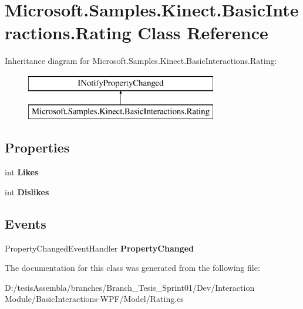 \hypertarget{class_microsoft_1_1_samples_1_1_kinect_1_1_basic_interactions_1_1_rating}{\section{Microsoft.\-Samples.\-Kinect.\-Basic\-Interactions.\-Rating Class Reference}
\label{class_microsoft_1_1_samples_1_1_kinect_1_1_basic_interactions_1_1_rating}
}
Inheritance diagram for Microsoft.\-Samples.\-Kinect.\-Basic\-Interactions.\-Rating\-:\begin{figure}[H]
\begin{center}
\leavevmode
\includegraphics[height=2.000000cm]{class_microsoft_1_1_samples_1_1_kinect_1_1_basic_interactions_1_1_rating}
\end{center}
\end{figure}
\subsection*{Properties}
\begin{DoxyCompactItemize}
\item 
\hypertarget{class_microsoft_1_1_samples_1_1_kinect_1_1_basic_interactions_1_1_rating_a912f80993885daf0d02cd237e120396e}{int {\bfseries Likes}}\label{class_microsoft_1_1_samples_1_1_kinect_1_1_basic_interactions_1_1_rating_a912f80993885daf0d02cd237e120396e}

\item 
\hypertarget{class_microsoft_1_1_samples_1_1_kinect_1_1_basic_interactions_1_1_rating_acacccf3c863254b6037c9752618b7968}{int {\bfseries Dislikes}}\label{class_microsoft_1_1_samples_1_1_kinect_1_1_basic_interactions_1_1_rating_acacccf3c863254b6037c9752618b7968}

\end{DoxyCompactItemize}
\subsection*{Events}
\begin{DoxyCompactItemize}
\item 
\hypertarget{class_microsoft_1_1_samples_1_1_kinect_1_1_basic_interactions_1_1_rating_aa8b1806a5e4f4ac6c1344f2d126bdc92}{Property\-Changed\-Event\-Handler {\bfseries Property\-Changed}}\label{class_microsoft_1_1_samples_1_1_kinect_1_1_basic_interactions_1_1_rating_aa8b1806a5e4f4ac6c1344f2d126bdc92}

\end{DoxyCompactItemize}


The documentation for this class was generated from the following file\-:\begin{DoxyCompactItemize}
\item 
D\-:/tesis\-Assembla/branches/\-Branch\-\_\-\-Tesis\-\_\-\-Sprint01/\-Dev/\-Interaction Module/\-Basic\-Interactions-\/\-W\-P\-F/\-Model/Rating.\-cs\end{DoxyCompactItemize}
